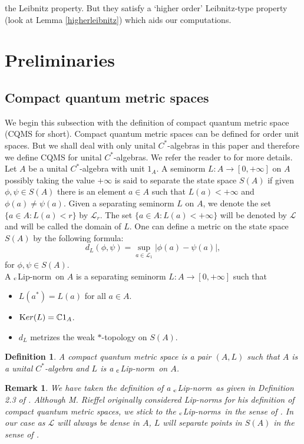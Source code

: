 \documentclass[a4paper,11pt,reqno]{amsart}
\theoremstyle{plain}
\newtheorem{defn}[thm]{Definition}
\newtheorem{rem}[thm]{Remark}
\theoremstyle{mainthmstyle}
\theoremstyle{named}
\numberwithin{equation}{section}
\newcommand{\clipnorm}{$_{\text{\rm c}}$Lip-norm}
\newcommand{\clipnorms}{$_{\text{\rm c}}$Lip-norms}
\begin{document}
the Leibnitz property. But they satisfy a `higher order' Leibnitz-type property (look at Lemma \ref{higherleibnitz}) which aids our computations. 
\section{Preliminaries}
\subsection{Compact quantum metric spaces}
We begin this subsection with the definition of compact quantum metric space (CQMS for short). Compact quantum metric spaces can be defined for order unit spaces. But we shall deal with only unital $C^{\ast}$-algebras in this paper and therefore we define CQMS for unital $C^{\ast}$-algebras. We refer the reader to \cite{Rieffel1} for more details. Let $A$ be a unital $C^{\ast}$-algebra with unit $1_{A}$. A seminorm $L:A\rightarrow[0,+\infty]$ on $A$ possibly taking the value $+\infty$ is said to separate the state space $S(A)$ if given $\phi,\psi\in S(A)$ there is an element $a\in A$ such that $L(a)<+\infty$ and $\phi(a)\neq\psi(a)$. Given a separating seminorm $L$ on $A$, we denote the set $\{a\in A:L(a)<r\}$ by $\mathcal{L}_{r}$. The set $\{a\in A:L(a)<+\infty\}$ will be denoted by $\mathcal{L}$ and will be called the domain of $L$. One can define a metric on the state space $S(A)$ by the following formula:
\begin{displaymath}
    d_{L}(\phi,\psi)=\sup\limits_{a\in\mathcal{L}_{1}}\lvert\phi(a)-\psi(a)\rvert,
\end{displaymath}
for $\phi,\psi\in S(A)$. \\
A \clipnorm\ on $A$ is a separating seminorm $L:A\rightarrow[0,+\infty]$ such that
\begin{itemize}
\item $L(a^{\ast})=L(a)$ for all $a\in A$.
    \item ${\textrm Ker}(L)=\mathbb{C}1_{A}$.
    \item $d_{L}$ metrizes the weak $\ast$-topology on $S(A)$.
\end{itemize}
\begin{defn}\label{CQMSdefn}
    A compact quantum metric space is a pair $(A,L)$ such that $A$ is a unital $C^{\ast}$-algebra and $L$ is a \clipnorm\ on $A$.
\end{defn}
\begin{rem}
    We have taken the definition of a \clipnorm\ as given in Definition 2.3 of \cite{Kerr}. Although M. Rieffel originally considered Lip-norms for his definition of compact quantum metric spaces, we stick to the \clipnorms\ in the sense of \cite{Kerr}. In our case as $\mathcal{L}$ will always be dense in $A$, $L$ will separate points in $S(A)$ in the sense of \cite{Kerr}. 
\end{rem}
\end{document}
